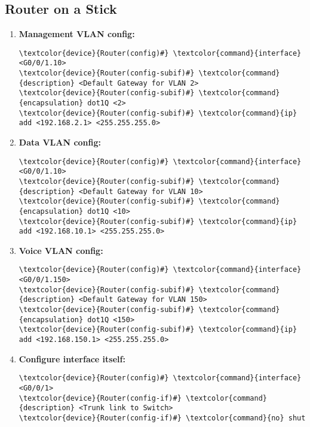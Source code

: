 \documentclass[10pt, a4paper, onecolumn, oneside, titlepage, openany]{book}
\begin{document}
\subsection{Router on a Stick}
\begin{enumerate}
    \item \textbf{Management VLAN config:}
\begin{Verbatim}[commandchars=\\\{\}]
\textcolor{device}{Router(config)#} \textcolor{command}{interface} <G0/0/1.10>
\textcolor{device}{Router(config-subif)#} \textcolor{command}{description} <Default Gateway for VLAN 2>
\textcolor{device}{Router(config-subif)#} \textcolor{command}{encapsulation} dot1Q <2>
\textcolor{device}{Router(config-subif)#} \textcolor{command}{ip} add <192.168.2.1> <255.255.255.0>
\end{Verbatim}
    \item \textbf{Data VLAN config:}
\begin{Verbatim}[commandchars=\\\{\}]
\textcolor{device}{Router(config)#} \textcolor{command}{interface} <G0/0/1.10>
\textcolor{device}{Router(config-subif)#} \textcolor{command}{description} <Default Gateway for VLAN 10>
\textcolor{device}{Router(config-subif)#} \textcolor{command}{encapsulation} dot1Q <10>
\textcolor{device}{Router(config-subif)#} \textcolor{command}{ip} add <192.168.10.1> <255.255.255.0>
\end{Verbatim}
    \item \textbf{Voice VLAN config:}
\begin{Verbatim}[commandchars=\\\{\}]
\textcolor{device}{Router(config)#} \textcolor{command}{interface} <G0/0/1.150>
\textcolor{device}{Router(config-subif)#} \textcolor{command}{description} <Default Gateway for VLAN 150>
\textcolor{device}{Router(config-subif)#} \textcolor{command}{encapsulation} dot1Q <150>
\textcolor{device}{Router(config-subif)#} \textcolor{command}{ip} add <192.168.150.1> <255.255.255.0>
\end{Verbatim}
    \item \textbf{Configure interface itself:}
\begin{Verbatim}[commandchars=\\\{\}]
\textcolor{device}{Router(config)#} \textcolor{command}{interface} <G0/0/1>
\textcolor{device}{Router(config-if)#} \textcolor{command}{description} <Trunk link to Switch>
\textcolor{device}{Router(config-if)#} \textcolor{command}{no} shut
\end{Verbatim}
\end{enumerate}
\end{document}
